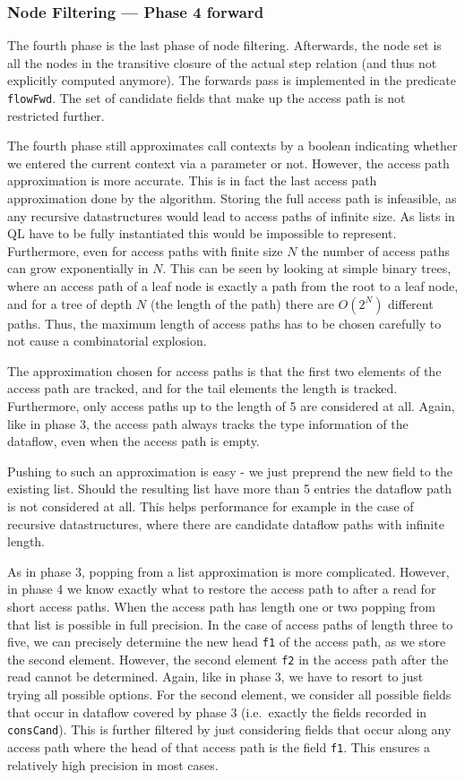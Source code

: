 \subsubsection*{Node Filtering --- Phase 4 forward}
The fourth phase is the last phase of node filtering.
Afterwards, the node set is all the nodes in the transitive closure of 
the actual step relation (and thus not explicitly computed anymore).
The forwards pass is implemented in the predicate \texttt{flowFwd}.
The set of candidate fields that make up the access path is not
restricted further.

The fourth phase still approximates call contexts by a boolean indicating 
whether we entered the current context via a parameter or not.
However, the access path approximation is more accurate.
This is in fact the last access path approximation done by the algorithm.
Storing the full access path is infeasible, as any recursive datastructures
would lead to access paths of infinite size.
As lists in QL have to be fully instantiated this would be impossible to 
represent.
Furthermore, even for access paths with finite size $N$ the number of access paths 
can grow exponentially in $N$.
This can be seen by looking at simple binary trees, where an access path 
of a leaf node is exactly a path from the root to a leaf node, and for a tree
of depth $N$ (the length of the path) there are $O(2^N)$ different paths.
Thus, the maximum length of access paths has to be chosen carefully to not 
cause a combinatorial explosion.

The approximation chosen for access paths is that the first two elements of
the access path are tracked, and for the tail elements the length is tracked.
Furthermore, only access paths up to the length of 5 are considered at all.
Again, like in phase 3, the access path always tracks the type information of the 
dataflow, even when the access path is empty.

Pushing to such an approximation is easy - we just preprend the new field to the 
existing list.
Should the resulting list have more than 5 entries the dataflow path is not considered
at all.
This helps performance for example in the case of recursive datastructures,
where there are candidate dataflow paths with infinite length.

As in phase 3, popping from a list approximation is more complicated.
However, in phase 4 we know exactly
what to restore the access path to after a read for short access paths.
When the access path has length one or two popping from that list 
is possible in full precision.
In the case of access paths of length three to five, we can precisely determine 
the new head \texttt{f1} of the access path, as we store the second element.
However, the second element \texttt{f2} in the access path after the read cannot be determined.
Again, like in phase 3, we have to resort to just trying all possible options.
For the second element, we consider all possible fields that occur in dataflow
covered by phase 3 (i.e.\ exactly the fields recorded in \texttt{consCand}).
This is further filtered by just considering fields that occur along any access path
where the head of that access path is the field \texttt{f1}.
This ensures a relatively high precision in most cases.


